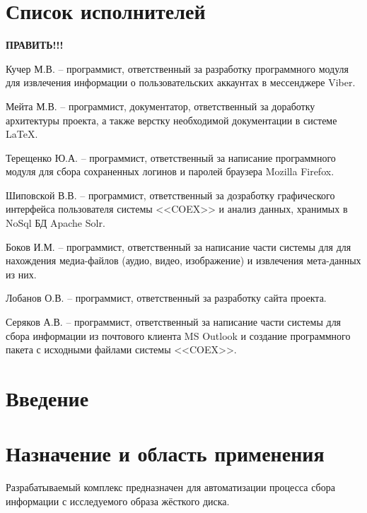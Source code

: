 


 
 
 
 \newpage
 \section*{Список исполнителей}
 
 \textbf{ПРАВИТЬ!!!}


 
Кучер М.В. -- программист, ответственный за разработку программного модуля для извлечения информации о пользовательских аккаунтах в мессенджере Viber.

Мейта М.В. -- программист, документатор, ответственный за доработку архитектуры проекта, а также верстку необходимой документации в системе \LaTeX.

Терещенко Ю.А. -- программист, ответственный за написание программного модуля для сбора сохраненных логинов и паролей браузера Mozilla Firefox.

Шиповской В.В. -- программист, ответственный за дозработку графического интерфейса пользователя системы <<COEX>> и анализ данных, хранимых в NoSql БД Apache Solr.


Боков И.М. -- программист, ответственный за написание части системы для для нахождения медиа-файлов (аудио, видео, изображение) и извлечения мета-данных из них.

Лобанов О.В. -- программист, ответственный за разработку сайта проекта. 

Серяков А.В. -- программист, ответственный за написание части системы для сбора информации из почтового клиента MS Outlook и создание программного пакета с исходными файлами системы <<COEX>>.




 
 \newpage
 \tableofcontents

 \newpage
 \section*{Введение}
 

 \section{Назначение и область применения}
Разрабатываемый комплекс предназначен для автоматизации процесса сбора информации с исследуемого образа жёсткого диска.

